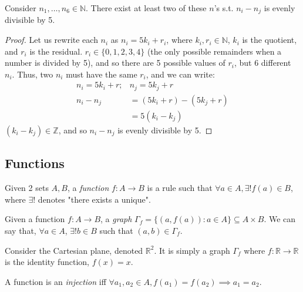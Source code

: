 \documentclass[12pt,oneside]{article}
\begin{document}
\begin{example}
  Consider $n_1, \dots, n_6 \in \mathbb{N}$. There exist at least two of these $n$'s s.t. $n_i - n_j$ is evenly divisible by 5.
  \begin{proof}[Proof]
    Let us rewrite each $n_i$ as $n_i = 5k_i + r_i$, where $k_i, r_i \in \mathbb{N}$, $k_i$ is the quotient, and $r_i$ is the residual. $r_i \in \{0, 1, 2, 3, 4\}$ (the only possible remainders when a number is divided by 5), and so there are 5 possible values of $r_i$, but 6 different $n_i$. Thus, two $n_i$ must have the same $r_i$, and we can write: 
    \begin{align*}
      n_i = 5k_i + r; &n_j = 5k_j + r\\
      n_i - n_j &= (5k_i + r) - (5k_j + r)\\
      &= 5(k_i-k_j)
    \end{align*}
    $(k_i - k_j) \in \mathbb{Z}$, and so $n_i - n_j$ is evenly divisible by 5. 
  \end{proof}
\end{example}

\subsection{Functions}

\begin{definition}[Function]
  Given 2 sets $A, B$, a \emph{function} $f: A \to B$ is a rule such that $\forall a \in A, \exists! f(a) \in B$, where $\exists!$ denotes "there exists a unique".
  
\end{definition}

\begin{definition}[Graph]
  Given a function $f: A \to B$, a \emph{graph} $\Gamma_f = \{(a,f(a)) : a \in A\} \subseteq A \times B$. We can say that, $\forall a \in A$, $\exists! b \in B$ such that $(a,b) \in \Gamma_f$.
\end{definition}

\begin{example}
  Consider the Cartesian plane, denoted $\mathbb{R}^2$. It is simply a graph $\Gamma_f$ where $f: \mathbb{R} \to \mathbb{R}$ is the identity function, $f(x) = x$.
\end{example}

\begin{definition}[Injective]
  A function is an \emph{injection} iff $\forall a_1, a_2 \in A, f(a_1) = f(a_2) \implies a_1 = a_2$.
\end{definition}
\end{document}

